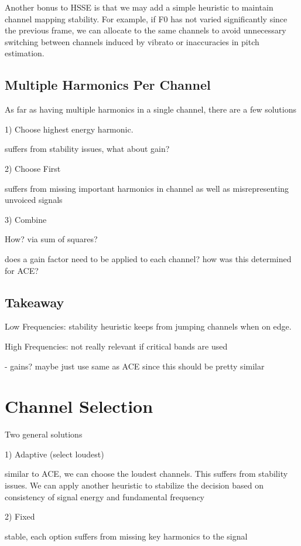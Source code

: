 \documentclass [11pt, proquest] {uwthesis}[2015/03/03]
\begin{document}
Another bonus to HSSE is that we may add a simple heuristic to maintain channel mapping stability.  For example, if F0 has not varied significantly since the previous frame, we can allocate to the same channels to avoid unnecessary switching between channels induced by vibrato or inaccuracies in pitch estimation.

\subsection{Multiple Harmonics Per Channel}
As far as having multiple harmonics in a single channel, there are a few solutions

1) Choose highest energy harmonic.

suffers from stability issues, what about gain?

2) Choose First

suffers from missing important harmonics in channel as well as misrepresenting unvoiced signals

3) Combine

How?  via sum of squares?

does a gain factor need to be applied to each channel?  how was this determined for ACE?

\subsection{Takeaway}

Low Frequencies: stability heuristic keeps from jumping channels when on edge.

High Frequencies: not really relevant if critical bands are used

- gains?  maybe just use same as ACE since this should be pretty similar
 

\section{Channel Selection}

Two general solutions

1) Adaptive (select loudest)

similar to ACE, we can choose the loudest channels.  This suffers from stability issues.  We can apply another heuristic to stabilize the decision based on consistency of signal energy and fundamental frequency

2) Fixed

stable, each option suffers from missing key harmonics to the signal
\end{document}
